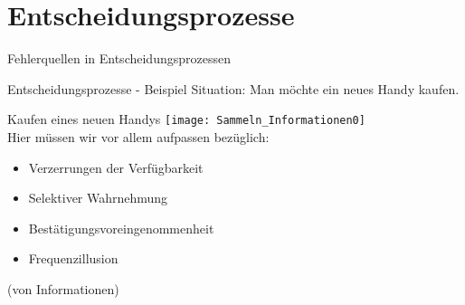 \section{Entscheidungsprozesse}

\begin{frame}[c]{Fehlerquellen in Entscheidungsprozessen}
    \centering
\end{frame}

\begin{frame}[c]{Entscheidungsprozesse - Beispiel}
    \Large
    Situation: Man möchte ein neues Handy kaufen. \\
\end{frame}


\begin{frame}[c]{Kaufen eines neuen Handys}
    \texttt{[image: Sammeln\_Informationen0]} \\
    Hier müssen wir vor allem aufpassen bezüglich:
    \begin{itemize}[<+(1)->]
        \item Verzerrungen der Verfügbarkeit
        \item Selektiver Wahrnehmung
        \item Bestätigungsvoreingenommenheit
        \item Frequenzillusion
    \end{itemize}
    (von Informationen)
\end{frame}


